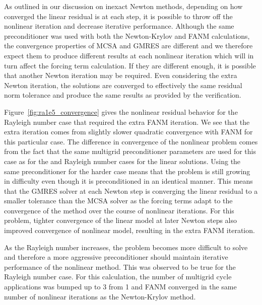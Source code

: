 As outlined in our discussion on inexact Newton methods, depending on
how converged the linear residual is at each step, it is possible to
throw off the nonlinear iteration and decrease iterative
performance. Although the same preconditioner was used with both the
Newton-Krylov and FANM calculations, the convergence properties of
MCSA and GMRES are different and we therefore expect them to produce
different results at each nonlinear iteration which will in turn
affect the forcing term calculation. If they are different enough, it
is possible that another Newton iteration may be required. Even
considering the extra Newton iteration, the solutions are converged to
effectively the same residual norm tolerance and produce the same
results as provided by the verification.

Figure~\ref{fig:ra1e5_convergence} gives the nonlinear residual
behavior for the  Rayleigh number case that required the
extra FANM iteration. We see that the extra iteration comes from
slightly slower quadratic convergence with FANM for this particular
case. The difference in convergence of the nonlinear problem comes
from the fact that the same multigrid preconditioner parameters are
used for this case as for the  and  Rayleigh number
cases for the linear solutions. Using the same preconditioner for the
harder  case means that the problem is still growing in
difficulty even though it is preconditioned in an identical
manner. This means that the GMRES solver at each Newton step is
converging the linear residual to a smaller tolerance than the MCSA
solver as the forcing terms adapt to the convergence of the method
over the course of nonlinear iterations. For this problem, tighter
convergence of the linear model at later Newton steps also improved
convergence of nonlinear model, resulting in the extra FANM iteration.

As the Rayleigh number increases, the problem becomes more difficult
to solve and therefore a more aggressive preconditioner should
maintain iterative performance of the nonlinear method. This was
observed to be true for the  Rayleigh number case. For this
calculation, the number of multigrid cycle applications was bumped up
to 3 from 1 and FANM converged in the same number of nonlinear
iterations as the Newton-Krylov method.

